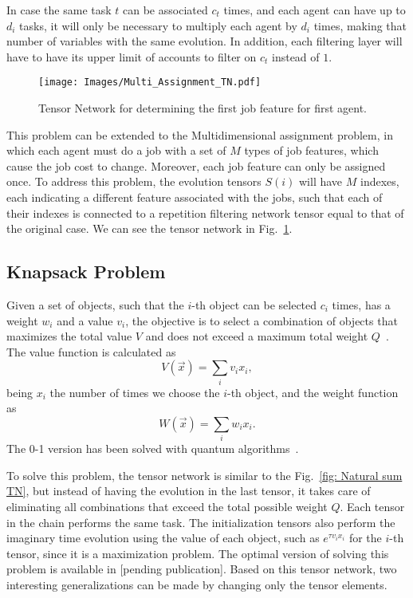 In case the same task $t$ can be associated $c_t$ times, and each agent can have up to $d_i$ tasks, it will only be necessary to multiply each agent by $d_i$ times, making that number of variables with the same evolution. In addition, each filtering layer will have to have its upper limit of accounts to filter on $c_t$ instead of $1$.

\begin{figure}[h]
    \centering
    \texttt{[image: Images/Multi\_Assignment\_TN.pdf]}
    \caption{Tensor Network for determining the first job feature for first agent.}
    \label{fig: Multi Assignment TN}
\end{figure}

This problem can be extended to the Multidimensional assignment problem, in which each agent must do a job with a set of $M$ types of job features, which cause the job cost to change. Moreover, each job feature can only be assigned once. To address this problem, the evolution tensors $S(i)$ will have $M$ indexes, each indicating a different feature associated with the jobs, such that each of their indexes is connected to a repetition filtering network tensor equal to that of the original case. We can see the tensor network in Fig.~\ref{fig: Multi Assignment TN}.

\subsection{Knapsack Problem}

Given a set of objects, such that the $i$-th object can be selected $c_i$ times, has a weight $w_i$ and a value $v_i$, the objective is to select a combination of objects that maximizes the total value $V$ and does not exceed a maximum total weight $Q$~\cite{Knapsack_original}. The value function is calculated as
\begin{equation}
    V(\vec{x})=\sum_i v_i x_i,
\end{equation}
being $x_i$ the number of times we choose the $i$-th object, and the weight function as
\begin{equation}
    W(\vec{x})=\sum_i w_i x_i.
\end{equation}
The 0-1 version has been solved with quantum algorithms~\cite{0_1_knapsack_quantum}.

To solve this problem, the tensor network is similar to the Fig.~\ref{fig: Natural sum TN}, but instead of having the evolution in the last tensor, it takes care of eliminating all combinations that exceed the total possible weight $Q$. Each tensor in the chain performs the same task. The initialization tensors also perform the imaginary time evolution using the value of each object, such as $e^{\tau v_i x_i}$ for the $i$-th tensor, since it is a maximization problem. The optimal version of solving this problem is available in {\color{red} [pending publication]}. Based on this tensor network, two interesting generalizations can be made by changing only the tensor elements.


